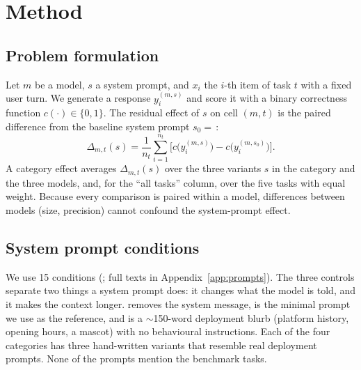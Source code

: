 \section{Method}
\label{sec:method}

\subsection{Problem formulation}
Let $m$ be a model, $s$ a system prompt, and $x_i$ the $i$-th item of task $t$ with a fixed user turn. We generate a response $y_{i}^{(m,s)}$ and score it with a binary correctness function $c(\cdot)\in\{0,1\}$. The residual effect of $s$ on cell $(m,t)$ is the paired difference from the baseline system prompt $s_0=$\,\baseline:
\begin{equation}
\Delta_{m,t}(s) = \frac{1}{n_t}\sum_{i=1}^{n_t} \Big[c\big(y_i^{(m,s)}\big) - c\big(y_i^{(m,s_0)}\big)\Big].
\end{equation}
A category effect averages $\Delta_{m,t}(s)$ over the three variants $s$ in the category and the three models, and, for the ``all tasks'' column, over the five tasks with equal weight. Because every comparison is paired within a model, differences between models (size, precision) cannot confound the system-prompt effect.

\subsection{System prompt conditions}
We use 15 conditions (; full texts in Appendix~\ref{app:prompts}). The three controls separate two things a system prompt does: it changes what the model is told, and it makes the context longer. \nosys removes the system message, \baseline is the minimal prompt we use as the reference, and \neutrallong is a $\sim$150-word deployment blurb (platform history, opening hours, a mascot) with no behavioural instructions. Each of the four categories has three hand-written variants that resemble real deployment prompts. None of the prompts mention the benchmark tasks.

